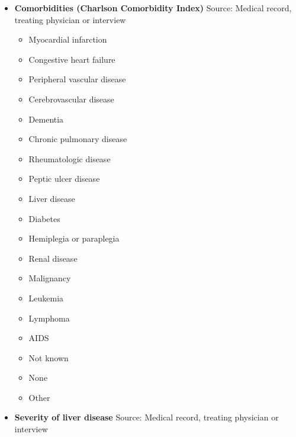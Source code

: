 \documentclass[
]{scrartcl}
\providecommand{\tightlist}{%
  \setlength{\itemsep}{0pt}\setlength{\parskip}{0pt}}\usepackage{longtable,booktabs,array}
\begin{document}
\begin{itemize}
  \begin{itemize}
  \tightlist
  \item
    Very Fit
  \item
    Fit
  \item
    Managing well
  \item
    Living with very mild frailty
  \item
    Living with mild frailty
  \item
    Living with moderate frailty
  \item
    Living with severe frailty
  \item
    Living with very severe frailty
  \item
    Terminally ill
  \item
    Not known
  \end{itemize}
\item
  \textbf{Comorbidities (Charlson Comorbidity Index)} Source: Medical
  record, treating physician or interview

  \begin{itemize}
  \tightlist
  \item
    Myocardial infarction
  \item
    Congestive heart failure
  \item
    Peripheral vascular disease
  \item
    Cerebrovascular disease
  \item
    Dementia
  \item
    Chronic pulmonary disease
  \item
    Rheumatologic disease
  \item
    Peptic ulcer disease
  \item
    Liver disease
  \item
    Diabetes
  \item
    Hemiplegia or paraplegia
  \item
    Renal disease
  \item
    Malignancy
  \item
    Leukemia
  \item
    Lymphoma
  \item
    AIDS
  \item
    Not known
  \item
    None
  \item
    Other
  \end{itemize}
\item
  \textbf{Severity of liver disease} Source: Medical record, treating
  physician or interview


\end{itemize}
\end{document}
